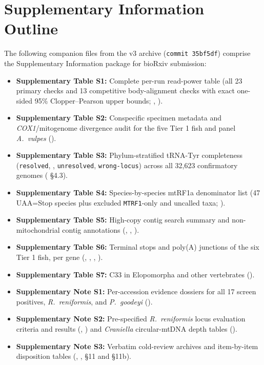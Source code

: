 \documentclass[11pt, a4paper]{article}
\begin{document}
\clearpage
\section*{Supplementary Information Outline}
The following companion files from the v3 archive (\texttt{commit 35bf5df}) comprise the Supplementary Information package for bioRxiv submission:
\begin{itemize}[leftmargin=1.4em, itemsep=0.25em]
\item \textbf{Supplementary Table S1:} Complete per-run read-power table (all 23 primary checks and 13 competitive body-alignment checks with exact one-sided 95\% Clopper--Pearson upper bounds; , ).
\item \textbf{Supplementary Table S2:} Conspecific specimen metadata and \textit{COX1}/mitogenome divergence audit for the five Tier 1 fish and panel \textit{A.\ vulpes} ().
\item \textbf{Supplementary Table S3:} Phylum-stratified tRNA-Tyr completeness (\texttt{resolved}, , \texttt{unresolved}, \texttt{wrong-locus}) across all 32,623 confirmatory genomes ( \S 4.3).
\item \textbf{Supplementary Table S4:} Species-by-species mtRF1a denominator list (47 UAA=Stop species plus excluded \texttt{MTRF1}-only and uncalled taxa; ).
\item \textbf{Supplementary Table S5:} High-copy contig search summary and non-mitochondrial contig annotations (, , ).
\item \textbf{Supplementary Table S6:} Terminal stops and poly(A) junctions of the six Tier 1 fish, per gene (, , , ).
\item \textbf{Supplementary Table S7:} C33 in Elopomorpha and other vertebrates ().
\item \textbf{Supplementary Note S1:} Per-accession evidence dossiers for all 17 screen positives, \textit{R.\ reniformis}, and \textit{P.\ goodeyi} ().
\item \textbf{Supplementary Note S2:} Pre-specified \textit{R.\ reniformis} locus evaluation criteria and results (, ) and \textit{Craniella} circular-mtDNA depth tables ().
\item \textbf{Supplementary Note S3:} Verbatim cold-review archives and item-by-item disposition tables (, ,  \S 11 and \S 11b).
\end{itemize}
\end{document}
